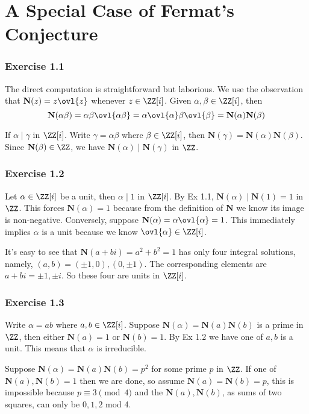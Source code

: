 \documentclass[../Chapter.tex]{subfiles}
\begin{document}
\chapter{A Special Case of Fermat's Conjecture}

\subsection*{Exercise 1.1}

The direct computation is straightforward but laborious. We use the observation that $\mathbf{N}(z)=z\ovl{z}$ whenever $z\in\ZZ[i]$. Given $\alpha,\beta\in\ZZ[i]$, then $$\mathbf{N}(\alpha\beta)=\alpha\beta\ovl{\alpha\beta}=\alpha\ovl{\alpha}\beta\ovl{\beta}=\mathbf{N}(\alpha)\mathbf{N}(\beta)$$

If $\alpha\mid\gamma$ in $\ZZ[i]$. Write $\gamma=\alpha\beta$ where $\beta\in\ZZ[i]$, then $\mathbf{N}(\gamma)=\mathbf{N}(\alpha)\mathbf{N}(\beta)$. Since $\mathbf{N}(\beta)\in\ZZ$, we have $\mathbf{N}(\alpha)\mid\mathbf{N}(\gamma)$ in $\ZZ$.

\subsection*{Exercise 1.2}

Let $\alpha\in\ZZ[i]$ be a unit, then $\alpha\mid 1$ in $\ZZ[i]$. By Ex 1.1, $\mathbf{N}(\alpha)\mid \mathbf{N}(1)=1$ in $\ZZ$. This forces $\mathbf{N}(\alpha)=1$ because from the definition of $\mathbf{N}$ we know its image is non-negative. Conversely, suppose $\mathbf{N}(\alpha)=\alpha\ovl{\alpha}=1$. This immediately implies $\alpha$ is a unit because we know $\ovl{\alpha}\in\ZZ[i]$.

It's easy to see that $\mathbf{N}(a+bi)=a^2+b^2=1$ has only four integral solutions, namely, $(a,b)=(\pm1,0),(0,\pm1)$. The corresponding elements are $a+bi=\pm1,\pm i$. So these four are units in $\ZZ[i]$.

\subsection*{Exercise 1.3}

Write $\alpha=ab$ where $a,b\in\ZZ[i]$. Suppose $\mathbf{N}(\alpha)=\mathbf{N}(a)\mathbf{N}(b)$ is a prime in $\ZZ$, then either $\mathbf{N}(a)=1$ or $\mathbf{N}(b)=1$. By Ex 1.2 we have one of $a,b$ is a unit. This means that $\alpha$ is irreducible.

Suppose $\mathbf{N}(\alpha)=\mathbf{N}(a)\mathbf{N}(b)=p^2$ for some prime $p$ in $\ZZ$. If one of $\mathbf{N}(a),\mathbf{N}(b)=1$ then we are done, so assume $\mathbf{N}(a)=\mathbf{N}(b)=p$, this is impossible because $p\equiv 3\pmod{4}$ and the $\mathbf{N}(a),\mathbf{N}(b)$, as sums of two squares, can only be $0,1,2$ mod 4.
\end{document}
